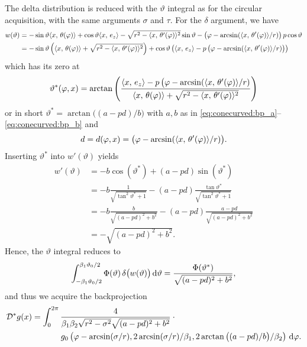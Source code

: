 \documentclass{amsart}
\renewcommand*{\phi}{\varphi}
\begin{document}
%
The delta distribution is reduced with the $\vartheta$ integral as for the circular acquisition, with the same arguments $\sigma$ and 
$\tau$. For the $\delta$ argument, we have
%
\begin{align*}
 w(\vartheta) 
 &= -\sin\vartheta \INNER{x}{\theta(\phi)} + \cos\vartheta \INNER{x}{e_z} - \sqrt{r^2 - \INNER{x}{\theta'(\phi)}^2} \sin\vartheta - 
 \big(\phi - \arcsin(\INNER{x}{\theta'(\phi)}/r)\big)\, p \cos\vartheta \\
 &= -\sin\vartheta \left( \INNER{x}{\theta(\phi)} + \sqrt{r^2 - \INNER{x}{\theta'(\phi)}^2} \right) + 
 \cos\vartheta \left( \INNER{x}{e_z} - p\, \big(\phi - \arcsin(\INNER{x}{\theta'(\phi)}/r)\big) \right)
\end{align*}
%
which has its zero at
%
\begin{equation}
 \label{eq:hconecurved:theta_in_delta}
 \vartheta^*(\phi, x) = \arctan \left( \frac{\INNER{x}{e_z} - p\, \big(\phi - \arcsin(\INNER{x}{\theta'(\phi)}/r)}{\INNER{x}{\theta(\phi)} + 
 \sqrt{r^2 - \INNER{x}{\theta'(\phi)}^2}} \right)
\end{equation} 
%
or in short $\vartheta^* = \arctan\big((a - pd) / b\big)$ with $a, b$ as in \eqref{eq:conecurved:bp_a}--\eqref{eq:conecurved:bp_b} and
%
\begin{equation}
 \label{eq:hconecurved:bp_d}
 d = d(\phi, x) = \big(\phi - \arcsin(\INNER{x}{\theta'(\phi)}/r)\big).
\end{equation}
%
Inserting $\vartheta^*$ into $w'(\vartheta)$ yields 
%
\begin{align*}
 w'(\vartheta) 
 &= -b \cos(\vartheta^*) + (a - pd)\sin(\vartheta^*) \\
 &= -b \frac{1}{\sqrt{\tan^2\vartheta^* + 1}} - (a - pd) \frac{\tan\vartheta^*}{\sqrt{\tan^2\vartheta^* + 1}} \\
 &= -b \frac{b}{\sqrt{(a-pd)^2 + b^2}} - (a - pd) \frac{a - pd}{\sqrt{(a-pd)^2 + b^2}} \\
 &= - \sqrt{(a-pd)^2 + b^2}.
\end{align*}
%
%
Hence, the $\vartheta$ integral reduces to
%
\begin{align*}
 \int_{-\beta_1\vartheta_0/2}^{\beta_1\vartheta_0/2} \Phi(\vartheta)\, \delta \big(w(\vartheta)\big) \, \mathrm{d}\vartheta = 
 \frac{\Phi(\vartheta^*)}{\sqrt{(a-pd)^2 + b^2}},
\end{align*}
%
and thus we acquire the backprojection
%
\begin{align}
 \label{eq:hconecurved:backproj}
 \DUALOPD g(x)
 &= \int_0^{2\pi} \frac{4}{\beta_1\beta_2\sqrt{r^2 - \sigma^2} \sqrt{(a-pd)^2 + b^2}} \cdot \phantom{x} \\
 &\hspace{35pt} g_0 \left( \phi - \arcsin(\sigma/r), 2\arcsin(\sigma/r)/\beta_1, 2\arctan\big((a-pd)/b\big)/\beta_2 \right)\, \D\phi. \notag
\end{align}
\vspace{5ex}%
\end{document}
